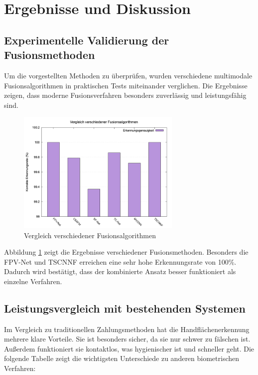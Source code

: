 \documentclass[paper=a4,fontsize=12pt,ngerman]{scrartcl}
\begin{document}
\vspace{1.5cm}



\vspace{2cm}

\section{Ergebnisse und Diskussion}

\subsection{Experimentelle Validierung der Fusionsmethoden}
Um die vorgestellten Methoden zu überprüfen, wurden verschiedene multimodale Fusionsalgorithmen in praktischen Tests miteinander verglichen. Die Ergebnisse zeigen, dass moderne Fusionsverfahren besonders zuverlässig und leistungsfähig sind.

\begin{figure}[h!]
\begin{center}
  \includegraphics[width=0.7\textwidth]{graphics/fusion_algorithms_comparison.png}
  \caption{Vergleich verschiedener Fusionsalgorithmen}
  \label{fig:fusion-comparison}
\end{center}
\end{figure}

Abbildung \ref{fig:fusion-comparison} zeigt die Ergebnisse verschiedener Fusionsmethoden. Besonders die FPV-Net und TSCNNF erreichen eine sehr hohe Erkennungsrate von 100\%. Dadurch wird bestätigt, dass der kombinierte Ansatz besser funktioniert als einzelne Verfahren.\cite{pan2024palm}

\vspace{1.5cm}

\subsection{Leistungsvergleich mit bestehenden Systemen}
Im Vergleich zu traditionellen Zahlungsmethoden hat die Handflächenerkennung mehrere klare Vorteile. Sie ist besonders sicher, da sie nur schwer zu fälschen ist. Außerdem funktioniert sie kontaktlos, was hygienischer ist und schneller geht. Die folgende Tabelle zeigt die wichtigsten Unterschiede zu anderen biometrischen Verfahren:
\end{document}
